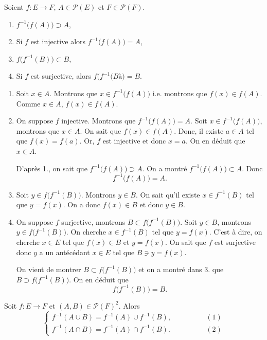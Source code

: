 \begin{prop}
	Soient $f: E \to F$, $A \in \mathcal{P}(E)$ et $F \in \mathcal{P}(F)$.

	\begin{enumerate}
		\item $f^{-1}\big(f(A)\big) \supset A$,
		\item Si $f$ est injective alors $f^{-1}\big(f(A)\big) = A$,
		\item $f\big(f^{-1}(B)\big) \subset B$,
		\item Si $f$ est surjective, alors $f\big(f^{-1}(Bà\big) = B$.
	\end{enumerate}
\end{prop}

\begin{prv}
	\begin{enumerate}
		\item Soit $x \in A$. Montrons que $x \in f^{-1}\big(f(A)\big)$ i.e. montrons que $f(x) \in f(A)$. Comme $x \in A$, $f(x) \in f(A)$.
		\item On suppose $f$ injective. Montrons que $f^{-1}\big(f(A)\big) = A$.
			Soit $x \in f^{-1}\big(f(A)\big)$, montrons que $x \in A$. On sait que $f(x) \in f(A)$. Donc, il existe $a \in A$ tel que $f(x) = f(a)$. Or, $f$ est injective et donc $x = a$. On en déduit que $x \in A$.

			D'après 1., on sait que $f^{-1}\big(f(A)\big) \supset A$. On a montré $f^{-1}\big(f(A)\big) \subset A$. Donc \[
				f^{-1}\big(f(A)\big) = A.
			\]
		\item Soit $y \in f\big(f^{-1}(B)\big)$. Montrons $y \in B$. On sait qu'il existe $x \in f^{-1}(B)$ tel que $y = f(x)$. On a donc $f(x) \in B$ et donc $y \in B$.
		\item On suppose $f$ surjective, montrons $B \subset f\big(f^{-1}(B)\big)$. Soit $y \in B$, montrons $y \in f\big(f^{-1}(B)\big)$. On cherche $x \in f^{-1}(B)$ tel que $y = f(x)$. C'est à dire, on cherche $x \in E$ tel que $f(x) \in B$ et $y = f(x)$. On sait que $f$ est surjective donc $y$ a un antécédant $x \in E$ tel que $B \ni y = f(x)$.

			On vient de montrer $B \subset f\big(f^{-1}(B)\big)$ et on a montré dans 3. que $B \supset f\big(f^{-1}(B)\big)$. On en déduit que \[
				f\big(f^{-1}(B)\big) = B.
			\]
	\end{enumerate}
\end{prv}

\begin{prop}
	Soit $f: E\to F$ et $(A,B) \in \mathcal{P}(F)^2$. Alors \[
		\begin{cases}
			f^{-1}(A \cup B) = f^{-1}(A) \cup f^{-1}(B),\qquad \qquad &(1)\\
			f^{-1}(A \cap B) = f^{-1}(A) \cap f^{-1}(B).&(2)
		\end{cases}
	\] 
\end{prop}

